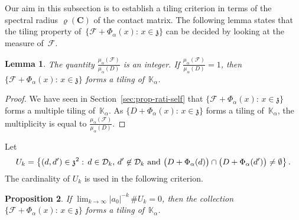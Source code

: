 \documentclass[12pt]{amsart}
\newtheorem{lemma}{Lemma}[section]
\newtheorem{proposition}[lemma]{Proposition}
\theoremstyle{definition}
\theoremstyle{remark}
\numberwithin{equation}{section}
\begin{document}
Our aim in this subsection is to establish a tiling criterion in terms of the spectral radius $\varrho(\mathbf{C})$ of the contact matrix.
The following lemma states that the tiling property of~$\{\mathcal{F} + \Phi_\alpha(x):\, x \in \mathfrak{z}\}$ can be decided by looking at the measure of~$\mathcal{F}$.

\begin{lemma}\label{lem:measuremultiple}
The quantity $\frac{\mu_\alpha(\mathcal{F})}{\mu_\alpha(D)}$ is an integer.
If $\frac{\mu_\alpha(\mathcal{F})}{\mu_\alpha(D)} = 1$, then $\{\mathcal{F} + \Phi_\alpha(x):\, x \in \mathfrak{z}\}$ forms a tiling of~$\mathbb{K}_\alpha$.
\end{lemma}

\begin{proof}
We have seen in Section~\ref{sec:prop-rati-self} that $\{\mathcal{F} + \Phi_\alpha(x):\, x \in \mathfrak{z}\}$ forms a multiple tiling of~$\mathbb{K}_\alpha$.
As $\{D + \Phi_\alpha(x):\, x \in \mathfrak{z}\}$ forms a tiling of~$\mathbb{K}_\alpha$,  the multiplicity is equal to $\frac{\mu_\alpha(\mathcal{F})}{\mu_\alpha(D)}$.
\end{proof}

Let
\[
U_k = \big\{(d,d') \in \mathfrak{z}^2:\, d \in \mathcal{D}_k,\, d' \not\in \mathcal{D}_k\ \hbox{and}\ \big(D+\Phi_\alpha(d)\big) \cap \big(D+\Phi_\alpha(d')\big) \neq \emptyset\big\}\,.
\]
The cardinality of $U_k$ is used in the following criterion.

\begin{proposition}\label{sigmacriterion}
If $\lim_{k\to\infty} |a_0|^{-k}\, \#U_k = 0$, then the collection $\{\mathcal{F} + \Phi_\alpha(x):\, x \in \mathfrak{z}\}$ forms a tiling of~$\mathbb{K}_\alpha$.
\end{proposition}
\end{document}
